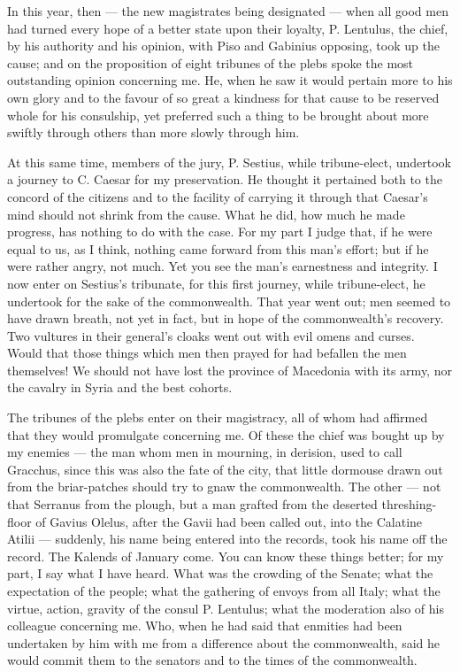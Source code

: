  In this year, then --- the new magistrates being designated --- when all good men had turned every hope of a better state upon their loyalty, P. Lentulus, the chief, by his authority and his opinion, with Piso and Gabinius opposing, took up the cause; and on the proposition of eight tribunes of the plebs spoke the most outstanding opinion concerning me. He, when he saw it would pertain more to his own glory and to the favour of so great a kindness for that cause to be reserved whole for his consulship, yet preferred such a thing to be brought about more swiftly through others than more slowly through him.

 At this same time, members of the jury, P. Sestius, while tribune-elect, undertook a journey to C. Caesar for my preservation. He thought it pertained both to the concord of the citizens and to the facility of carrying it through that Caesar's mind should not shrink from the cause. What he did, how much he made progress, has nothing to do with the case. For my part I judge that, if he were equal to us, as I think, nothing came forward from this man's effort; but if he were rather angry, not much. Yet you see the man's earnestness and integrity. I now enter on Sestius's tribunate, for this first journey, while tribune-elect, he undertook for the sake of the commonwealth. That year went out; men seemed to have drawn breath, not yet in fact, but in hope of the commonwealth's recovery. Two vultures in their general's cloaks went out with evil omens and curses. Would that those things which men then prayed for had befallen the men themselves! We should not have lost the province of Macedonia with its army, nor the cavalry in Syria and the best cohorts.

 The tribunes of the plebs enter on their magistracy, all of whom had affirmed that they would promulgate concerning me. Of these the chief was bought up by my enemies --- the man whom men in mourning, in derision, used to call Gracchus, since this was also the fate of the city, that little dormouse drawn out from the briar-patches should try to gnaw the commonwealth. The other --- not that Serranus from the plough, but a man grafted from the deserted threshing-floor of Gavius Olelus, after the Gavii had been called out, into the Calatine Atilii --- suddenly, his name being entered into the records, took his name off the record. The Kalends of January come. You can know these things better; for my part, I say what I have heard. What was the crowding of the Senate; what the expectation of the people; what the gathering of envoys from all Italy; what the virtue, action, gravity of the consul P. Lentulus; what the moderation also of his colleague concerning me. Who, when he had said that enmities had been undertaken by him with me from a difference about the commonwealth, said he would commit them to the senators and to the times of the commonwealth.

